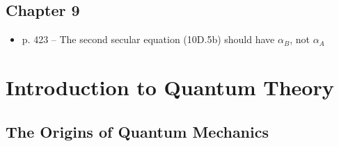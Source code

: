\documentclass[12pt, openany, letterpaper]{memoir}
\begin{document}
\section*{Chapter 9}
\begin{itemize}
	\item p. 423 -- The second secular equation (10D.5b) should have $\alpha_B$, not $\alpha_A$
\end{itemize}


\setcounter{chapter}{6}
\chapter{Introduction to Quantum Theory}
\section{The Origins of Quantum Mechanics}
\end{document}
